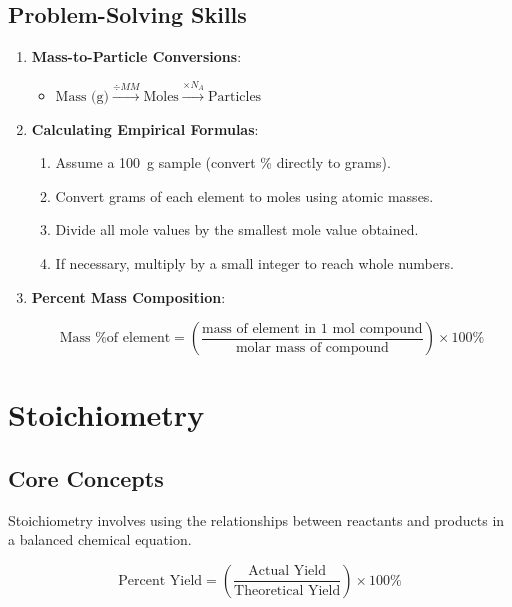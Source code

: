 \documentclass[11pt]{article}
\begin{document}
\subsection{Problem-Solving Skills}
\begin{enumerate}
    \item \textbf{Mass-to-Particle Conversions}:
    \begin{itemize}
        \item $\text{Mass (g)} \xrightarrow{\div MM} \text{Moles} \xrightarrow{\times N_A} \text{Particles}$
    \end{itemize}
    
    \item \textbf{Calculating Empirical Formulas}:
    \begin{enumerate}[label=\alph*)]
        \item Assume a \SI{100}{\gram} sample (convert \% directly to grams).
        \item Convert grams of each element to moles using atomic masses.
        \item Divide all mole values by the smallest mole value obtained.
        \item If necessary, multiply by a small integer to reach whole numbers.
    \end{enumerate}

    \item \textbf{Percent Mass Composition}:
    \begin{tcolorbox}[memorize]
        \[ \text{Mass \% of element} = \left( \frac{\text{mass of element in 1 mol compound}}{\text{molar mass of compound}} \right) \times 100\% \]
    \end{tcolorbox}
\end{enumerate}

\newpage

\section{Stoichiometry}

\subsection{Core Concepts}
Stoichiometry involves using the relationships between reactants and products in a balanced chemical equation.

\begin{tcolorbox}[memorize, title=Reaction Efficiency (Must Memorize)]
    \[ \text{Percent Yield} = \left( \frac{\text{Actual Yield}}{\text{Theoretical Yield}} \right) \times 100\% \]
\end{tcolorbox}
\end{document}
